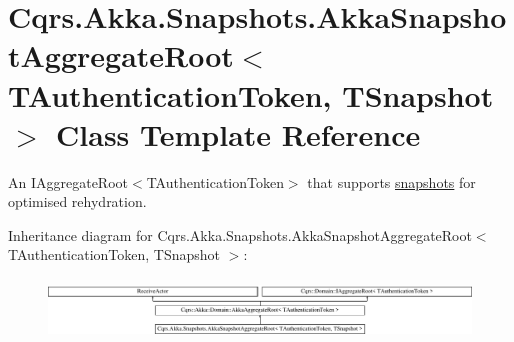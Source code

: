 \hypertarget{classCqrs_1_1Akka_1_1Snapshots_1_1AkkaSnapshotAggregateRoot}{}\section{Cqrs.\+Akka.\+Snapshots.\+Akka\+Snapshot\+Aggregate\+Root$<$ T\+Authentication\+Token, T\+Snapshot $>$ Class Template Reference}
\label{classCqrs_1_1Akka_1_1Snapshots_1_1AkkaSnapshotAggregateRoot}


An I\+Aggregate\+Root$<$\+T\+Authentication\+Token$>$ that supports \hyperlink{}{snapshots} for optimised rehydration.  


Inheritance diagram for Cqrs.\+Akka.\+Snapshots.\+Akka\+Snapshot\+Aggregate\+Root$<$ T\+Authentication\+Token, T\+Snapshot $>$\+:\begin{figure}[H]
\begin{center}
\leavevmode
\includegraphics[height=1.612284cm]{classCqrs_1_1Akka_1_1Snapshots_1_1AkkaSnapshotAggregateRoot}
\end{center}
\end{figure}
